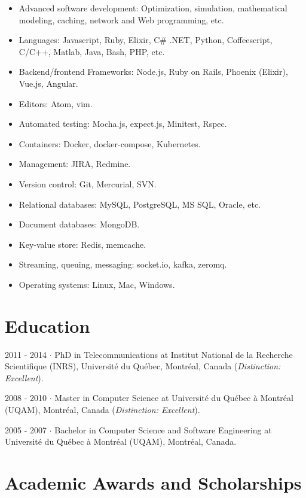 \documentclass{cv}
\begin{document}
\begin{itemize}
	  \item Advanced software development: Optimization, simulation, mathematical modeling, caching, network and Web programming, etc. 
	  \item Languages: Javascript, Ruby, Elixir, C\# .NET, Python, Coffeescript, C/C++, Matlab, Java, Bash, PHP, etc.
	  \item Backend/frontend Frameworks: Node.js, Ruby on Rails, Phoenix (Elixir), Vue.js, Angular.
	  \item Editors: Atom, vim.
	  \item Automated testing: Mocha.js, expect.js, Minitest, Rspec.
	  \item Containers: Docker, docker-compose, Kubernetes.
	  \item Management: JIRA, Redmine.
	  \item Version control: Git, Mercurial, SVN.
	  \item Relational databases: MySQL, PostgreSQL, MS SQL, Oracle, etc.
	  \item Document databases: MongoDB.
	  \item Key-value store: Redis, memcache.
	  \item Streaming, queuing, messaging: socket.io, kafka, zeromq.
	  \item Operating systems: Linux, Mac, Windows.
\end{itemize}

\newpage

\section{Education}

\begin{formation}
  \item[2011 - 2014]
     $\cdot$ PhD in Telecommunications at Institut National de la Recherche Scientifique (INRS), Universit\'e du Qu\'ebec, Montr\'eal, Canada (\emph{Distinction: Excellent}).
  \item[2008 - 2010]
     $\cdot$ Master in Computer Science
at Universit\'e du Qu\'ebec \`a Montr\'eal (UQAM), Montr\'eal, Canada (\emph{Distinction: Excellent}). 
  \item[2005 - 2007]
    $\cdot$ Bachelor in Computer Science and Software Engineering at Universit\'e du Qu\'ebec \`a Montr\'eal (UQAM), Montr\'eal, Canada.
\end{formation}

\section{Academic Awards and Scholarships}
\end{document}
